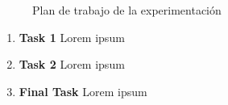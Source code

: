 \begin{figure}
\centering
{}
\caption{Plan de trabajo de la experimentación}
\label{fig:plan-trabajo-experimentación}
\end{figure}

\begin{enumerate}

\item \textbf{Task 1} Lorem ipsum

\item \textbf{Task 2} Lorem ipsum

\item \textbf{Final Task} Lorem ipsum

\end{enumerate}
